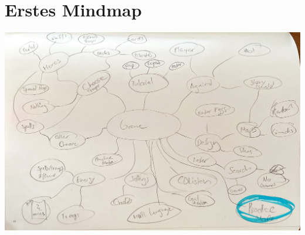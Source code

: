 \section{Erstes Mindmap}
\begin{center}
    \includegraphics*[width=14.5cm]{resources/sk_mindmap1.png}
\end{center}



